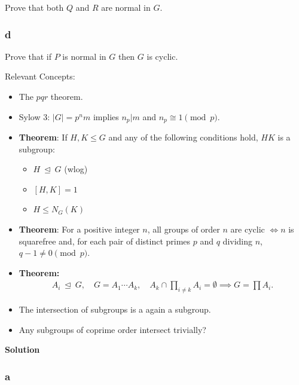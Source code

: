 Prove that both \(Q\) and \(R\) are normal in \(G\).

\hypertarget{d-3}{%
\subsubsection{d}\label{d-3}}

Prove that if \(P\) is normal in \(G\) then \(G\) is cyclic.

\begin{solution}

Relevant Concepts:

\begin{itemize}
\item
  The \(pqr\) theorem.
\item
  Sylow 3: \({\left\lvert {G} \right\rvert} = p^n m\) implies
  \(n_p \mathrel{\Big|}m\) and \(n_p \cong 1 \pmod p\).
\item
  \textbf{Theorem}: If \(H, K \leq G\) and any of the following
  conditions hold, \(HK\) is a subgroup:

  \begin{itemize}
  \tightlist
  \item
    \(H{~\trianglelefteq~}G\) (wlog)
  \item
    \([H, K] = 1\)
  \item
    \(H \leq N_G(K)\)
  \end{itemize}
\item
  \textbf{Theorem}: For a positive integer \(n\), all groups of order
  \(n\) are cyclic \(\iff n\) is squarefree and, for each pair of
  distinct primes \(p\) and \(q\) dividing \(n\),
  \(q - 1 \neq 0 \pmod p\).
\item
  \textbf{Theorem:}
  \begin{align*}
  A_i{~\trianglelefteq~}G, \quad G = A_1 \cdots A_k,\quad A_k \cap\prod_{i\neq k} A_i = \emptyset \implies G = \prod A_i
  .\end{align*}
\item
  The intersection of subgroups is a again a subgroup.
\item
  Any subgroups of coprime order intersect trivially?
\end{itemize}

\textbf{Solution}

\hypertarget{a-13}{%
\subsubsection{a}\label{a-13}}


\end{solution}
